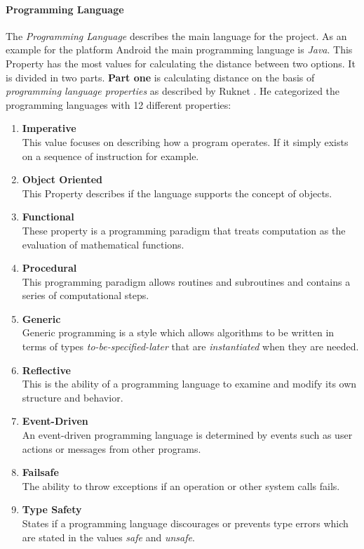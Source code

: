 \paragraph*{\textbf{Programming Language}}\label{section:ProgrammingLanguage}
The \textit{Programming Language} describes the main language for the project. As an example for the platform Android the main programming language is \textit{Java}. This Property has the most values for calculating the distance between two options. It is divided in two parts. \textbf{Part one} is calculating distance on the basis of \textit{programming language properties} as described by Ruknet \cite{ruknet}. He categorized the programming languages with 12 different properties:
\begin{enumerate}
	\item \textbf{Imperative}\\ This value focuses on describing how a program operates. If it simply exists on a sequence of instruction for example.
	\item \textbf{Object Oriented}\\ This Property describes if the language supports the concept of objects.
	\item \textbf{Functional}\\ These property is a programming paradigm that treats computation as the evaluation of mathematical functions. 
	\item \textbf{Procedural}\\ This programming paradigm allows routines and subroutines and contains a series of computational steps.
	\item \textbf{Generic}\\ Generic programming is a style which allows algorithms to be written in terms of types \textit{to-be-specified-later} that are \textit{instantiated} when they are needed.
	\item \textbf{Reflective}\\ This is the ability of a programming language to examine and modify its own structure and behavior.
	\item \textbf{Event-Driven}\\ An event-driven programming language is determined by events such as user actions or messages from other programs.
	\item \textbf{Failsafe}\\ The ability to throw exceptions if an operation or other system calls fails.
	\item \textbf{Type Safety}\\States if a programming language discourages or prevents type errors which are stated in the values \textit{safe} and \textit{unsafe}.

\end{enumerate}
